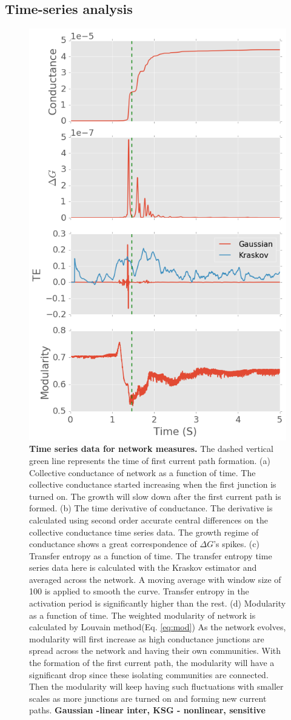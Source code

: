 \documentclass[fleqn,10pt,  amsmath,amssymb,aps]{wlscirep}
\begin{document}
\subsection*{Time-series analysis}

\begin{figure}
	\centering
	\includegraphics[width=0.5\linewidth]{figure/time_series}
	\caption{\textbf{Time series data for network measures.} The dashed vertical green line represents the 			time of first current path formation.
			\newline (a) Collective conductance of network as a function of time. The collective conductance started increasing when the first junction is turned on. The growth will slow down after the first current path is formed.
			\newline (b) The time derivative of conductance. The derivative is calculated using second order accurate central differences on the collective conductance time series data. The growth regime of conductance shows a great correspondence of $\Delta G$'s spikes.
			\newline (c) Transfer entropy as a function of time. The transfer entropy time series data here is calculated with the Kraskov estimator and averaged across the network. A moving average with window size of 100 is applied to smooth the curve. Transfer entropy in the activation period is significantly higher than the rest.
			\newline (d) Modularity as a function of time. The weighted modularity of network is calculated by Louvain method(Eq. \ref{eq:mod}) As the network evolves, modularity will first increase as high conductance junctions are spread across the network and having their own communities. With the formation of the first current path, the modularity will have a significant drop since these isolating communities are connected. Then the modularity will keep having such fluctuations with smaller scales as more junctions are turned on and forming new current paths.
			\textbf{Gaussian -linear inter, KSG - nonlinear, sensitive}}
	\label{fig:time_series}
\end{figure}
\end{document}
